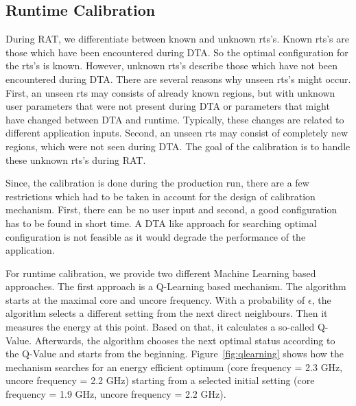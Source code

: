 \subsection{Runtime Calibration} \label{sec:calibration}
During RAT, we differentiate between known and unknown rts's. 
Known rts's are those which have been encountered during DTA. So the optimal configuration for the rts's is known. 
However, unknown rts's describe those which have not been encountered during DTA. 
There are several reasons why unseen rts's might occur. 
First, an unseen rts may consists of already known regions, but with unknown user parameters that were not present during DTA or parameters that might have changed between DTA and runtime. Typically, these changes are related to different application inputs. 
Second, an unseen rts may consist of completely new regions, which were not seen during DTA. 
The goal of the calibration is to handle these unknown rts's during RAT.

Since, the calibration is done during the production run, there are a few restrictions which had to be taken in account for the design of calibration mechanism. 
First, there can be no user input and 
second, a good configuration has to be found in short time. 
A DTA like approach for searching optimal configuration is not feasible as it would degrade the performance of the application.

For runtime calibration, we provide two different Machine Learning based approaches. The first approach is a Q-Learning based mechanism. The algorithm starts at the maximal core and uncore frequency. With a probability of {$\epsilon$}, the algorithm selects a different setting from the next direct neighbours. Then it measures the energy at this point. Based on that, it calculates a so-called Q-Value. Afterwards, the algorithm chooses the next optimal status according to the Q-Value and starts from the beginning. Figure~\ref{fig:qlearning} shows how the mechanism searches for an energy efficient optimum (core frequency = 2.3 GHz, uncore frequency = 2.2 GHz) starting from a selected initial setting (core frequency = 1.9 GHz, uncore frequency = 2.2 GHz).

